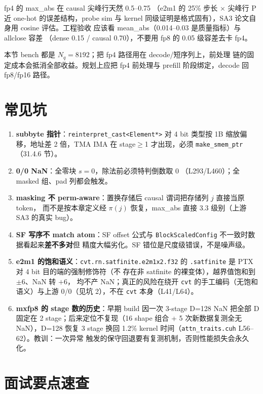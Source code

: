 fp4 的 max\_abs 在 causal 尖峰行天然 0.5--0.75
（e2m1 的 25\% 步长 × 尖峰行 P 近 one-hot 的误差结构，probe sim 与
kernel 同级证明是格式固有），SA3 论文自身用 cosine 评估。工程验收
应该看 mean\_abs（0.014--0.03 是质量指标）与 allclose 容差
（dense 0.15 / causal 0.70），不要用 fp8 的 0.05 级容差去卡 fp4。

本节 bench 都是 $N_q{=}8192$；把 fp4 路径用在 decode/短序列上，前处理
链的固定成本会抵消全部收益。规划上应把
fp4 前处理与 prefill 阶段绑定，decode 回 fp8/fp16 路径。

\section{常见坑}

\begin{enumerate}[itemsep=2pt,topsep=2pt]
  \item \textbf{subbyte 指针}：\texttt{reinterpret\_cast<Element*>} 对
        4 bit 类型按 1B 缩放偏移，地址差 2 倍，TMA IMA 在
        stage$\ge$1 才出现，必须 \texttt{make\_smem\_ptr}（31.4.6 节）。
  \item \textbf{0/0 NaN}：全零块 $s=0$，除法前必须特判倒数取 0
        （L293/L460）；全 masked 组、pad 列都会触发。
  \item \textbf{masking 不 perm-aware}：置换存储后 causal 谓词把存储列 $j$ 直接当原 token，
        而不是按本章定义经 $\pi(j)$ 恢复，max\_abs 直接 3.3 级别（上游 SA3 的真实 bug）。
  \item \textbf{SF 写序不 match atom}：SF offset 公式与
        \texttt{BlockScaledConfig} 不一致时数据看起来\textbf{差不多对}但
        精度大幅劣化。SF 错位是尺度级错误，不是噪声级。
  \item \textbf{e2m1 的饱和语义}：\texttt{cvt.rn.satfinite.e2m1x2.f32}
        的 \texttt{.satfinite} 是 PTX 对 4 bit 目的端的强制修饰符（不
        存在非 satfinite 的裸变体），越界值饱和到 $\pm$6、NaN 转 $+6$，
        均不产 NaN；真正的风险在绕开 \texttt{cvt} 的手工编码（无饱和
        语义）与上游 0/0（见坑 2），不在 \texttt{cvt} 本身（L41/L64）。
  \item \textbf{mxfp8 的 stage 数的历史}：早期 build 因一次 3-stage
        D=128 NaN 把全部 D 固定在 2 stage；后来定位不复现（16 shape 组合
        + 5 次新数据复测全无 NaN），D=128 恢复 3 stage 换回 1.2\% kernel
        时间（\texttt{attn\_traits.cuh} L56--62）。教训：一次异常
        触发的保守回退要有复测机制，否则性能损失会永久化。
\end{enumerate}

\section{面试要点速查}

